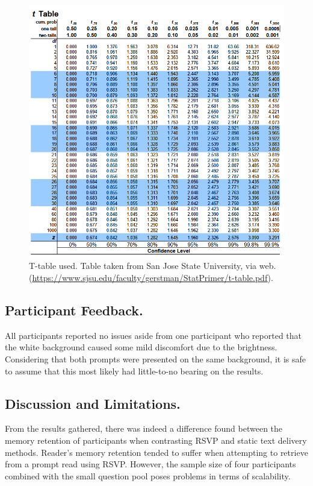 \documentclass[manuscript,screen]{acmart}
\begin{document}
\begin{figure}[htbp]
  \centering
  \includegraphics[width=\linewidth]{t-table.PNG}
  \caption{T-table used. Table taken from San Jose State University, via web. (\url{https://www.sjsu.edu/faculty/gerstman/StatPrimer/t-table.pdf}).}
\end{figure}

\FloatBarrier

\subsection{Participant Feedback.}
All participants reported no issues aside from one participant who reported that the white background caused some mild discomfort due to the brightness. Considering that both prompts were presented on the same background, it is safe to assume that this most likely had little-to-no bearing on the results.

\subsection{Discussion and Limitations.}
From the results gathered, there was indeed a difference found between the memory retention of participants when contrasting RSVP and static text delivery methods. Reader's memory retention tended to suffer when attempting to retrieve from a prompt read using RSVP. However, the sample size of four participants combined with the small question pool poses problems in terms of scalability.
\end{document}
